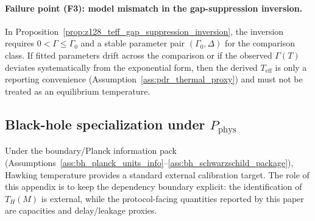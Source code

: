 \paragraph{Failure point (F3): model mismatch in the gap-suppression inversion.}
\AuditTag In Proposition~\ref{prop:z128_teff_gap_suppression_inversion}, the inversion requires $0<\Gamma\le\Gamma_0$ and a stable parameter pair $(\Gamma_0,\Delta)$ for the comparison class.
If fitted parameters drift across the comparison or if the observed $\Gamma(T)$ deviates systematically from the exponential form, then the derived $T_{\mathrm{eff}}$ is only a reporting convenience (Assumption~\ref{ass:pdr_thermal_proxy}) and must not be treated as an equilibrium temperature.

\subsection{Black-hole specialization under \texorpdfstring{$P_{\mathrm{phys}}$}{Pphys}}
\label{subsec:teff_bh_specialization}

\AuditTag Under the boundary/Planck information pack (Assumptions~\ref{ass:bh_planck_units_info}--\ref{ass:bh_schwarzschild_package}), Hawking temperature provides a standard external calibration target.
The role of this appendix is to keep the dependency boundary explicit: the identification of $T_H(M)$ is external, while the protocol-facing quantities reported by this paper are capacities and delay/leakage proxies.

